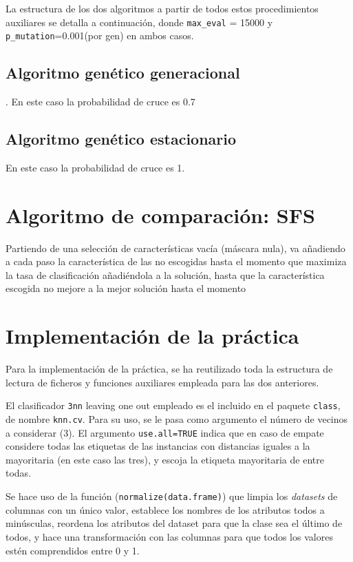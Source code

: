 \documentclass[a4paper,11pt]{article}
\begin{document}
La estructura de los dos algoritmos a partir de todos estos procedimientos auxiliares se detalla a continuación, donde
\texttt{max\_eval} = 15000 y \texttt{p\_mutation}=0.001(por gen) en ambos casos.

\subsection{Algoritmo genético generacional}.
En este caso la probabilidad de cruce es 0.7

\small{\texttt{}}
\normalsize

\subsection{Algoritmo genético estacionario}
En este caso la probabilidad de cruce es 1.

\small{\texttt{}}
\normalsize

\section{Algoritmo de comparación: SFS}
\small{\texttt{}}

Partiendo de una selección de características vacía (máscara nula), va añadiendo a cada paso la característica
de las no escogidas hasta el momento que maximiza la tasa de clasificación añadiéndola a la solución, hasta
que la característica escogida no mejore a la mejor solución hasta el momento

\section{Implementación de la práctica}
Para la implementación de la práctica, se ha reutilizado toda la estructura de lectura de ficheros y funciones auxiliares
empleada para las dos anteriores.

El clasificador \texttt{3nn} leaving one out empleado es el incluido en el paquete \texttt{class}, de nombre
\texttt{knn.cv}. Para su uso, se le pasa como argumento el número de vecinos a considerar (3). El argumento 
\texttt{use.all=TRUE} indica que en caso de empate considere todas las etiquetas de las instancias con distancias 
iguales a la mayoritaria (en este caso las tres), y escoja la etiqueta mayoritaria de entre todas. 

Se hace uso de la función (\texttt{normalize(data.frame)}) que limpia los \textit{datasets} de columnas con
un único valor, establece los nombres de los atributos todos a minúsculas, reordena los atributos del dataset para que
la clase sea el último de todos, y hace una transformación con las columnas para que todos los valores estén comprendidos
entre 0 y 1.
\end{document}
